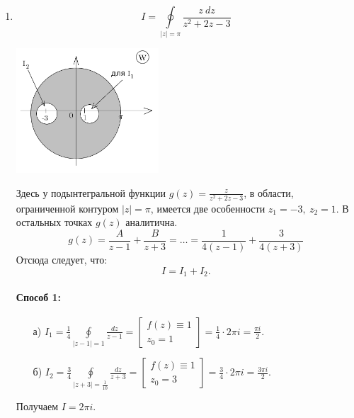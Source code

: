 \documentclass[../../main.tex]{subfiles}
\begin{document}
\begin{examples}
	\begin{enumerate}
		\item 
		\[ I = \oint \limits_{|z| = \pi} \frac{z \ dz}{z^2 + 2z - 3}  \]
		\begin{center}
		\includegraphics[width=0.42\textwidth]{lec32_3}
		\end{center}
		Здесь у подынтегральной функции $g(z) = \frac{z}{z^2 + 2z - 3}$, в области, 
		ограниченной контуром $|z| = \pi$, имеется две особенности $z_1 = -3,\ z_2 = 
		1$. В остальных точках $g(z)$ аналитична.
		\[  g(z) = \frac{A}{z-1} + \frac{B}{z+3} = \dots = \frac{1}{4(z-1)} + 
		\frac{3}{4(z+3)}  \]
		Отсюда следует, что:
		\[ I = I_1 + I_2.  \]
			\paragraph{Способ 1:}
			\begin{itemize}
				\item[а)]
				$\displaystyle I_1 = \frac{1}{4} \oint \limits_{|z-1| = 1} \frac{dz}{z-1} 
				= \left[ 
				\begin{gathered} f(z) \equiv 1 \\
				z_0 = 1 
				\end{gathered} \right] = \frac{1}{4} \cdot 2 \pi i = \frac{\pi i }{2}    .$
				\item[б)]  
				$\displaystyle  I_2 = \frac{3}{4} \oint \limits_{|z+3| = \frac{1}{10}} 
				\frac{dz}{z+3} = 
				\left[ \begin{gathered} f(z) \equiv 1 \\
				z_0 = 3 
				\end{gathered} \right] = \frac{3}{4} \cdot 2 \pi i = \frac{3 \pi i }{2}    
				.$
			\end{itemize}
			Получаем $ I = 2 \pi i $.

\end{enumerate}
\end{examples}
\end{document}
